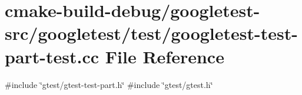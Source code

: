 \hypertarget{googletest-test-part-test_8cc}{}\section{cmake-\/build-\/debug/googletest-\/src/googletest/test/googletest-\/test-\/part-\/test.cc File Reference}
\label{googletest-test-part-test_8cc}
{\ttfamily \#include \char`\"{}gtest/gtest-\/test-\/part.\+h\char`\"{}}\newline
{\ttfamily \#include \char`\"{}gtest/gtest.\+h\char`\"{}}\newline
